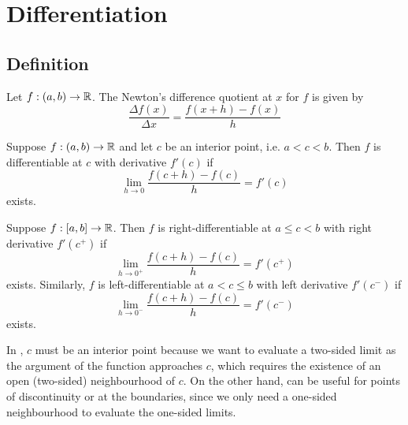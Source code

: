\chapter{Differentiation}


\section{Definition}
\begin{definition}
  Let $f: (a, b) \to \mathbb{R}$. The Newton's difference quotient at $x$ for $f$ is given by
  \[
    \frac{\Delta f(x)}{\Delta x} = \frac{f(x + h) - f(x)}{h}
  \]
\end{definition}
\begin{definition}[Derivative]
  \label{def:derivative}
  Suppose $f: (a, b) \to \mathbb{R}$ and let $c$ be an interior point, i.e. $a < c < b$. Then $f$ is differentiable at $c$ with derivative $f'(c)$ if
  \[
    \lim_{h \to 0} \frac{f(c + h) - f(c)}{h} = f'(c)
  \]
  exists.
\end{definition}
\begin{definition}
  \label{def:left-right-derivatives}
  Suppose $f: [a, b] \to \mathbb{R}$. Then $f$ is right-differentiable at $a \leq c < b$ with right derivative $f'(c ^ +)$ if
  \[
    \lim_{h \to 0 ^ +} \frac{f(c + h) - f(c)}{h} = f'(c ^ +)
  \]
  exists. Similarly, $f$ is left-differentiable at $a < c \leq b$ with left derivative $f'(c ^ -)$ if
  \[
    \lim_{h \to 0 ^ -} \frac{f(c + h) - f(c)}{h} = f'(c ^ -)
  \]
  exists.
\end{definition}
In , $c$ must be an interior point because we want to evaluate a two-sided limit as the argument of the function approaches $c$, which requires the existence of an open (two-sided) neighbourhood of $c$. On the other hand,  can be useful for points of discontinuity or at the boundaries, since we only need a one-sided neighbourhood to evaluate the one-sided limits.

